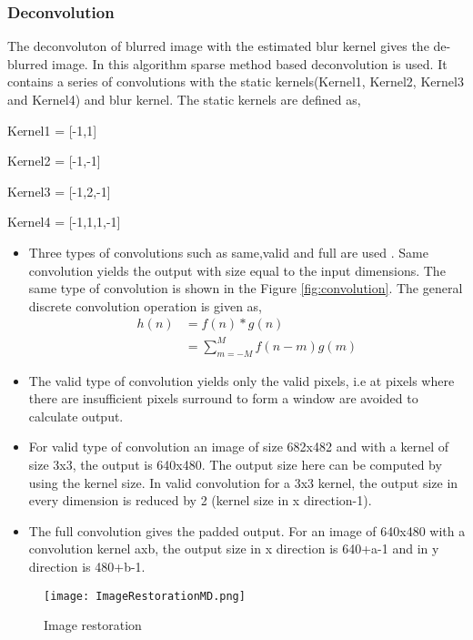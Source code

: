 \subsubsection{Deconvolution}
The deconvoluton of blurred image with the estimated blur kernel gives the de-blurred image. In this algorithm sparse method based deconvolution is used. It contains a series of convolutions with the static kernels(Kernel1, Kernel2, Kernel3 and Kernel4) and blur kernel. The static kernels are defined as,\par\noindent
Kernel1 = [-1,1] \par\noindent
Kernel2 = [-1,-1] \par\noindent
Kernel3 = [-1,2,-1] \par\noindent
Kernel4 = [-1,1,1,-1]
\begin{itemize}
\item Three types of convolutions such as same,valid and full are used \cite{BlurredImageRestoration}. Same convolution yields the output with size equal to the input dimensions. The same type of convolution is shown in the Figure \ref{fig:convolution}. The general discrete convolution operation is given as,
\begin{equation}\label{conveq}
\begin{split}
	h(n)&=f(n)*g(n) \\
	&=\sum_{m=-M}^{M} f(n-m)g(m)
\end{split}
\end{equation}
\item The valid type of convolution yields only the valid pixels, i.e at pixels where there are insufficient pixels surround to form a window are avoided to calculate output.
\item For valid type of convolution an image of size 682x482 and with a kernel of size 3x3, the output is 640x480. The output size here can be computed by using the kernel size. In valid convolution for a 3x3 kernel, the output size in every dimension is reduced by 2 (kernel size in x direction-1).
\item The full convolution gives the padded output. For an image of 640x480 with a convolution kernel axb, the output size in x direction is 640+a-1 and in y direction is 480+b-1.
\end{itemize}
\begin{figure}[h!]
	\centering
	\texttt{[image: ImageRestorationMD.png]}
	\caption{Image restoration}
	\label{deconv}
\end{figure}

